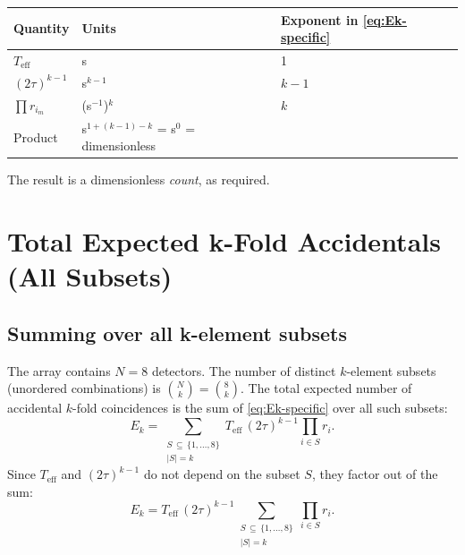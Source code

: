 \documentclass[12pt]{article}
\theoremstyle{definition}
\newcommand{\Teff}{T_{\!\text{eff}}}
\newcommand{\Eacc}[1]{E_{#1}}
\begin{document}
\begin{center}
\renewcommand{\arraystretch}{1.3}
\begin{tabular}{lll}
\toprule
Quantity & Units & Exponent in \eqref{eq:Ek-specific} \\
\midrule
$\Teff$      & s                    & 1 \\
$(2\tau)^{k-1}$ & s$^{k-1}$         & $k-1$ \\
$\prod r_{i_m}$ & (s$^{-1}$)$^k$  & $k$ \\
\midrule
Product      & s$^{1+(k-1)-k}$ = s$^0$ = dimensionless & \\
\bottomrule
\end{tabular}
\end{center}

The result is a dimensionless \emph{count}, as required.

\section{Total Expected k-Fold Accidentals (All Subsets)}
\label{sec:total-kfold}

\subsection{Summing over all k-element subsets}

The array contains $N = 8$ detectors.  The number of distinct
$k$-element subsets (unordered combinations) is $\binom{N}{k} = \binom{8}{k}$.
The total expected number of accidental $k$-fold coincidences is the
sum of \eqref{eq:Ek-specific} over all such subsets:
\begin{equation}
    \Eacc{k}
    = \sum_{\substack{S\,\subseteq\,\{1,\ldots,8\}\\ |S|=k}}
        \Teff\,(2\tau)^{k-1}\prod_{i\in S} r_i.
    \label{eq:Ek-total-pre}
\end{equation}
Since $\Teff$ and $(2\tau)^{k-1}$ do not depend on the subset $S$, they
factor out of the sum:
\begin{equation}
    \boxed{
        \Eacc{k}
        = \Teff\,(2\tau)^{k-1}
          \sum_{\substack{S\,\subseteq\,\{1,\ldots,8\}\\ |S|=k}}
          \prod_{i\in S} r_i.
    }
    \tag{6.3}
    \label{eq:Ek-total}
\end{equation}
\end{document}
